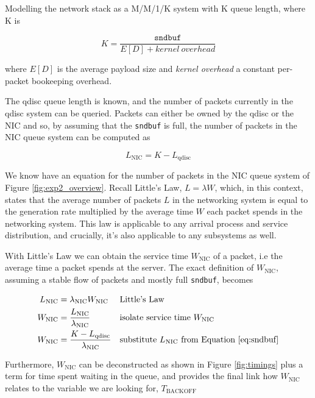 Modelling the network stack as a M/M/1/K system with K queue length, where K
is

\begin{equation}
K = \frac{\mathtt{sndbuf}}{E[D] + \mathit{kernel~overhead}}
\end{equation}

where $E[D]$ is the average payload size and \emph{kernel overhead} a constant
per-packet bookeeping overhead.

The qdisc queue length is known, and the number of packets currently in the
qdisc system can be queried. Packets can either be owned by the qdisc or the
NIC and so, by assuming that the \texttt{sndbuf} is full, the number of
packets in the NIC queue system can be computed as

\begin{equation}
\label{eq:sndbuf}
L_\text{NIC} = K - L_\text{qdisc}
\end{equation}

We know have an equation for the number of packets in the NIC queue system of
Figure \ref{fig:exp2_overview}. Recall Little's Law, $L = \lambda W$, which,
in this context, states that the average number of packets $L$ in the
networking system is equal to the generation rate multiplied by the average
time $W$ each packet spends in the networking system. This law is applicable
to any arrival process and service distribution, and crucially, it's also
applicable to any subsystems as well.

With Little's Law we can obtain the service time $W_\text{NIC}$ of a packet,
i.e the average time a packet spends at the server. The exact definition of
$W_\text{NIC}$, assuming a stable flow of packets and mostly full
\texttt{sndbuf}, becomes

\begin{align}
\label{eq:wnic1}
    L_\text{NIC} &= \lambda_\text{NIC} W_\text{NIC}         && \text{Little's Law}\nonumber\\
    W_\text{NIC} &= \frac{L_\text{NIC}}{\lambda_\text{NIC}} && \text{isolate service time}~W_\text{NIC}\nonumber\\
    W_\text{NIC} &= \frac{K - L_\text{qdisc}}{\lambda_\text{NIC}} && \text{substitute}~L_\text{NIC}~\text{from Equation \ref{eq:sndbuf}}
\end{align}

Furthermore, $W_\text{NIC}$ can be deconstructed as shown in Figure
\ref{fig:timings} plus a term for time spent waiting in the queue, and
provides the final link how $W_\text{NIC}$ relates to the variable we are
looking for, $T_\text{BACKOFF}$

